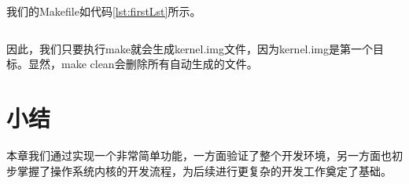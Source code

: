 \documentclass[main.tex]{subfiles}
\begin{document}
\begin{CJK*}{UTF8}{song}
\par
我们的Makefile如代码\ref{lst:firstLst}所示。
\begin{code}
\label{lst:firstLst}
\inputminted[linenos,numbersep=5pt,frame=lines,framesep=2mm]{make}{src/chapter02/kernel/Makefile}
\end{code}
因此，我们只要执行make就会生成kernel.img文件，因为kernel.img是第一个目标。显然，make clean会删除所有自动生成的文件。

\section{小结}
本章我们通过实现一个非常简单功能，一方面验证了整个开发环境，另一方面也初步掌握了操作系统内核的开发流程，为后续进行更复杂的开发工作奠定了基础。

\clearpage
\ifxetex\else
\end{CJK*}
\fi
\end{document}
